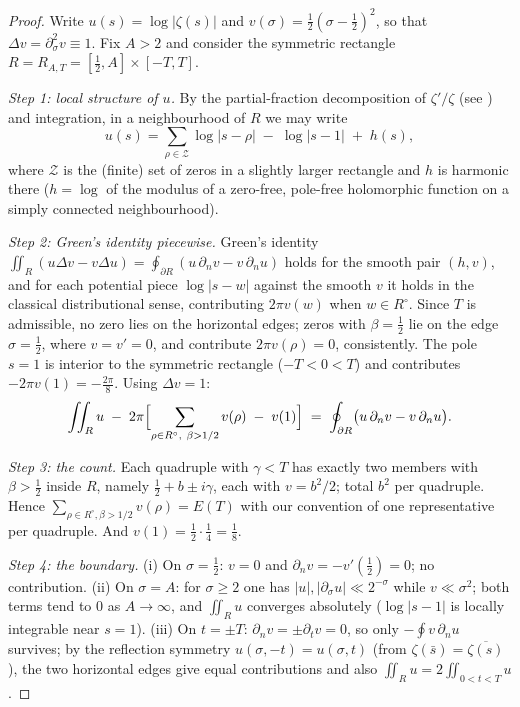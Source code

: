\documentclass[11pt]{amsart}
\theoremstyle{plain}
\theoremstyle{definition}
\theoremstyle{remark}
\begin{document}
\begin{proof}
Write $u(s)=\log|\zeta(s)|$ and $v(\sigma)=\tfrac12(\sigma-\tfrac12)^2$, so that $\Delta v=\partial_\sigma^2 v\equiv1$. Fix $A>2$ and consider the symmetric rectangle $R=R_{A,T}=[\tfrac12,A]\times[-T,T]$.

\emph{Step 1: local structure of $u$.} By the partial-fraction decomposition of $\zeta'/\zeta$ (see \cite[Ch.~15--16]{Davenport}) and integration, in a neighbourhood of $R$ we may write
\[
u(s)=\sum_{\rho\in\mathcal Z}\log|s-\rho|\;-\;\log|s-1|\;+\;h(s),
\]
where $\mathcal Z$ is the (finite) set of zeros in a slightly larger rectangle and $h$ is harmonic there ($h=\log$ of the modulus of a zero-free, pole-free holomorphic function on a simply connected neighbourhood).

\emph{Step 2: Green's identity piecewise.} Green's identity $\iint_R(u\Delta v-v\Delta u)=\oint_{\partial R}(u\,\partial_n v-v\,\partial_n u)$ holds for the smooth pair $(h,v)$, and for each potential piece $\log|s-w|$ against the smooth $v$ it holds in the classical distributional sense, contributing $2\pi v(w)$ when $w\in R^\circ$. Since $T$ is admissible, no zero lies on the horizontal edges; zeros with $\beta=\tfrac12$ lie on the edge $\sigma=\tfrac12$, where $v=v'=0$, and contribute $2\pi v(\rho)=0$, consistently. The pole $s=1$ is interior to the symmetric rectangle ($-T<0<T$) and contributes $-2\pi v(1)=-\tfrac{2\pi}{8}$. Using $\Delta v=1$:
\[
\iint_R u
\;-\;2\pi\Bigl[\sum_{\rho\in R^\circ,\ \beta>1/2} v(\rho)\;-\;v(1)\Bigr]
\;=\;\oint_{\partial R}\bigl(u\,\partial_n v-v\,\partial_n u\bigr).
\]

\emph{Step 3: the count.} Each quadruple with $\gamma<T$ has exactly two members with $\beta>\tfrac12$ inside $R$, namely $\tfrac12+b\pm i\gamma$, each with $v=b^2/2$; total $b^2$ per quadruple. Hence $\sum_{\rho\in R^\circ,\beta>1/2}v(\rho)=E(T)$ with our convention of one representative per quadruple. And $v(1)=\tfrac12\cdot\tfrac14=\tfrac18$.

\emph{Step 4: the boundary.} (i) On $\sigma=\tfrac12$: $v=0$ and $\partial_n v=-v'(\tfrac12)=0$; no contribution. (ii) On $\sigma=A$: for $\sigma\ge2$ one has $|u|,|\partial_\sigma u|\ll 2^{-\sigma}$ while $v\ll\sigma^2$; both terms tend to $0$ as $A\to\infty$, and $\iint_R u$ converges absolutely ($\log|s-1|$ is locally integrable near $s=1$). (iii) On $t=\pm T$: $\partial_n v=\pm\partial_t v=0$, so only $-\oint v\,\partial_n u$ survives; by the reflection symmetry $u(\sigma,-t)=u(\sigma,t)$ (from $\zeta(\bar s)=\overline{\zeta(s)}$), the two horizontal edges give equal contributions and also $\iint_R u=2\iint_{0<t<T}u$.


\end{proof}
\end{document}
